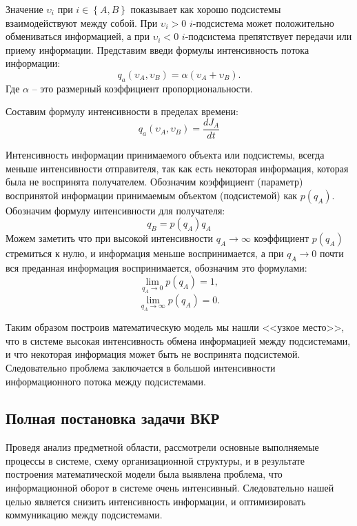 Значение $\upsilon_i$ при $i \in \left\{A,B \right\}$ показывает как хорошо подсистемы взаимодействуют между собой. При $\upsilon_i > 0$ $i$-подсистема может положительно обмениваться информацией, а при $\upsilon_i < 0$ $i$-подсистема препятствует передачи или приему информации. Представим введи формулы интенсивность потока информации:
\begin{equation}\label{eq:intensive}
q_a(\upsilon_A,\upsilon_B) = \alpha (\upsilon_A + \upsilon_B).
\end{equation}
Где $\alpha$ -- это размерный коэффициент пропорциональности.

Составим формулу интенсивности в пределах времени:
\begin{equation}\label{eq:intensiveA}
q_a(\upsilon_A,\upsilon_B) = \frac{dJ_A}{dt}
\end{equation}

Интенсивность информации принимаемого объекта или подсистемы, всегда меньше интенсивности отправителя, так как есть некоторая информация, которая была не воспринята получателем. Обозначим коэффициент (параметр) воспринятой информации принимаемым объектом (подсистемой) как $p(q_A)$. Обозначим формулу интенсивности для получателя:
\begin{equation}\label{eq:intensiveB}
q_B = p(q_A)q_A
\end{equation}
Можем заметить что при высокой интенсивности $q_A \rightarrow \infty$ коэффициент $p(q_A)$ стремиться к нулю, и информация меньше воспринимается, а при $q_A \rightarrow 0$ почти вся преданная информация воспринимается, обозначим это формулами:
\begin{equation}\label{eq:lim1}
\lim_{q_A \rightarrow 0} p(q_A) = 1,
\end{equation}
\begin{equation}\label{eq:lim0}
\lim_{q_A \rightarrow \infty} p(q_A) = 0.
\end{equation}

Таким образом построив математическую модель мы нашли <<узкое место>>, что в системе высокая интенсивность обмена информацией между подсистемами, и что некоторая информация может быть не воспринята подсистемой. Следовательно проблема заключается в большой интенсивности информационного потока между подсистемами.

\subsection{Полная постановка задачи ВКР}
Проведя анализ предметной области, рассмотрели основные выполняемые процессы в системе, схему организационной структуры, и в результате построения математической модели была выявлена проблема, что информационной оборот в системе очень интенсивный. Следовательно нашей целью является снизить интенсивность информации, и оптимизировать коммуникацию между подсистемами.

